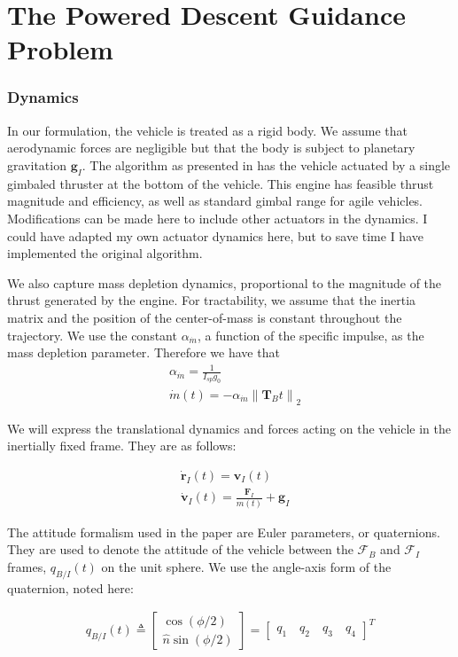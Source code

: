 \chapter{The Powered Descent Guidance Problem}
\label{mathchapter}


\subsection{Dynamics}
In our formulation, the vehicle is treated as a rigid body. We assume that aerodynamic forces are negligible but that the body is subject to planetary gravitation $\mathbf{g}_I$. The algorithm as presented in \cite{} has the vehicle actuated by a single gimbaled thruster at the bottom of the vehicle. This engine has feasible thrust magnitude and efficiency, as well as standard gimbal range for agile vehicles. Modifications can be made here to include other actuators in the dynamics. I could have adapted my own actuator dynamics here, but to save time I have implemented the original algorithm.

We also capture mass depletion dynamics, proportional to the magnitude of the thrust generated by the engine. For tractability, we assume that the inertia matrix and the position of the center-of-mass is constant throughout the trajectory. We use the constant $\alpha_{\dot{m}}$, a function of the specific impulse, as the mass depletion parameter. Therefore we have that
\begin{align}
& \alpha_{\dot{m}} = \frac{1}{I_{sp} g_0} \\
& \dot{m}(t) = -\alpha_{\dot{m}} \left\lVert \mathbf{T}_B{t} \right\rVert _2
\end{align}

We will express the translational dynamics and forces acting on the vehicle in the inertially fixed frame. They are as follows:

\begin{align}
& \dot{\mathbf{r}}_I(t) = \mathbf{v}_I(t) \\
& \dot{\mathbf{v}}_I(t) = \frac{\mathbf{F}_I}{m(t)} + \mathbf{g}_I
\end{align}

The attitude formalism used in the paper are Euler parameters, or quaternions. They are used to denote the attitude of the vehicle between the $\mathcal{F}_B$ and $\mathcal{F}_I$ frames, $q_{B/I}(t)$ on the unit sphere. We use the angle-axis form of the quaternion, noted here:

\begin{align}
q_{B/I}(t) \triangleq 
	\begin{bmatrix}
	\cos(\phi/2) \\ \hat{n}\sin(\phi/2)
	\end{bmatrix}
	= 
	\begin{bmatrix}
	q_1 \quad q_2 \quad q_3 \quad q_4
	\end{bmatrix}^T
\end{align}

